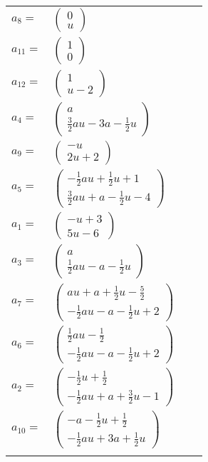 \documentclass[1p]{elsarticle_modified}
\theoremstyle{definition}
\begin{document}
\begin{tabular}{m{7pt} m{180pt} m{7pt} m{180pt} }
\flushright $a_{8}=$&$\begin{pmatrix}0\\u\end{pmatrix}$ \\
\flushright $a_{11}=$&$\begin{pmatrix}1\\0\end{pmatrix}$ \\
\flushright $a_{12}=$&$\begin{pmatrix}1\\u-2\end{pmatrix}$ \\
\flushright $a_{4}=$&$\begin{pmatrix}a\\\frac{3}{2} a u-3 a-\frac{1}{2} u\end{pmatrix}$ \\
\flushright $a_{9}=$&$\begin{pmatrix}- u\\2 u+2\end{pmatrix}$ \\
\flushright $a_{5}=$&$\begin{pmatrix}-\frac{1}{2} a u+\frac{1}{2} u+1\\\frac{3}{2} a u+a-\frac{1}{2} u-4\end{pmatrix}$ \\
\flushright $a_{1}=$&$\begin{pmatrix}- u+3\\5 u-6\end{pmatrix}$ \\
\flushright $a_{3}=$&$\begin{pmatrix}a\\\frac{1}{2} a u- a-\frac{1}{2} u\end{pmatrix}$ \\
\flushright $a_{7}=$&$\begin{pmatrix}a u+a+\frac{1}{2} u-\frac{5}{2}\\-\frac{1}{2} a u- a-\frac{1}{2} u+2\end{pmatrix}$ \\
\flushright $a_{6}=$&$\begin{pmatrix}\frac{1}{2} a u-\frac{1}{2}\\-\frac{1}{2} a u- a-\frac{1}{2} u+2\end{pmatrix}$ \\
\flushright $a_{2}=$&$\begin{pmatrix}-\frac{1}{2} u+\frac{1}{2}\\-\frac{1}{2} a u+a+\frac{3}{2} u-1\end{pmatrix}$ \\
\flushright $a_{10}=$&$\begin{pmatrix}- a-\frac{1}{2} u+\frac{1}{2}\\-\frac{1}{2} a u+3 a+\frac{1}{2} u\end{pmatrix}$\\&\end{tabular}
\end{document}
